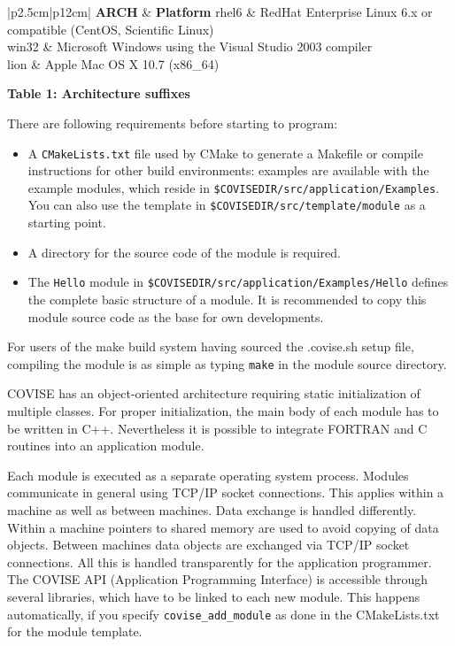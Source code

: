 \begin{longtable}{|p{2.5cm}|p{12cm}|}
\hline
   {\bf ARCH} & {\bf Platform}  \endhead
\hline\hline
   rhel6 & RedHat Enterprise Linux 6.x or compatible (CentOS, Scientific Linux) \\
\hline
	win32 &  Microsoft Windows using the Visual Studio 2003 compiler \\
\hline
	lion &  Apple Mac OS X 10.7 (x86\_64)\\
\hline
\end{longtable}
{\bf Table 1: Architecture suffixes}

There are following requirements before starting to program:

\begin{itemize}

   \item A \texttt{CMakeLists.txt} file  used by CMake to generate a Makefile  or
compile instructions for other build environments: examples are available with the example modules, 
which reside in \verb+$COVISEDIR/src/application/Examples+.
You can also use the template in \verb+$COVISEDIR/src/template/module+ as a
starting point.

\item A directory for the source code of the module is required.

\item The {\tt Hello} module in {\tt \$COVISEDIR/src/application/Examples/Hello} defines 
the complete basic structure of a module. It is recommended to copy this module source 
code as the base for own developments.

\end{itemize}

For users of the make build system having sourced the .covise.sh setup file,
compiling the module is as simple as typing \texttt{make} in the module source directory.

COVISE has an object-oriented architecture requiring static initialization of 
multiple classes. For proper initialization, the main body of each module has to be 
written in C++. Nevertheless it is possible to integrate FORTRAN and C routines into 
an application module. 

Each module is executed as a separate operating system process.
Modules communicate in general 
using TCP/IP socket connections.
This applies within a machine as well as between 
machines.
Data exchange is handled differently. Within a machine pointers to shared 
memory are used  to avoid copying of data objects. Between machines data objects are 
exchanged via TCP/IP socket connections. All this is handled transparently  for  
the application programmer.
The COVISE API (Application Programming Interface) is 
accessible through several libraries, which have to be linked to each new module. 
This happens automatically, if you specify \texttt{covise\_add\_module} as done
in the CMakeLists.txt for the module template.

